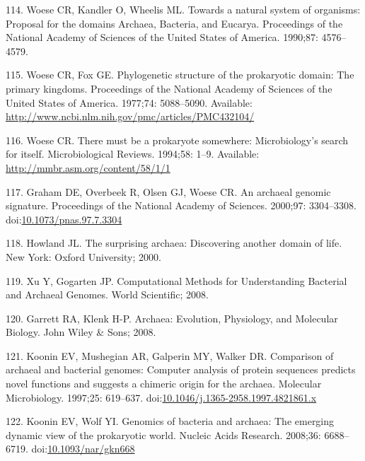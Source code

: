\documentclass[12pt,twoside]{reedthesis}
\begin{document}
  \hypertarget{ref-woeseux5ftowardsux5f1990}{}
  114. Woese CR, Kandler O, Wheelis ML. Towards a natural system of
  organisms: Proposal for the domains Archaea, Bacteria, and Eucarya.
  Proceedings of the National Academy of Sciences of the United States of
  America. 1990;87: 4576--4579.
  
  \hypertarget{ref-woeseux5fphylogeneticux5f1977}{}
  115. Woese CR, Fox GE. Phylogenetic structure of the prokaryotic domain:
  The primary kingdoms. Proceedings of the National Academy of Sciences of
  the United States of America. 1977;74: 5088--5090. Available:
  \url{http://www.ncbi.nlm.nih.gov/pmc/articles/PMC432104/}
  
  \hypertarget{ref-woeseux5fthereux5f1994}{}
  116. Woese CR. There must be a prokaryote somewhere: Microbiology's
  search for itself. Microbiological Reviews. 1994;58: 1--9. Available:
  \url{http://mmbr.asm.org/content/58/1/1}
  
  \hypertarget{ref-grahamux5farchaealux5f2000}{}
  117. Graham DE, Overbeek R, Olsen GJ, Woese CR. An archaeal genomic
  signature. Proceedings of the National Academy of Sciences. 2000;97:
  3304--3308.
  doi:\href{https://doi.org/10.1073/pnas.97.7.3304}{10.1073/pnas.97.7.3304}
  
  \hypertarget{ref-howlandux5fsurprisingux5f2000}{}
  118. Howland JL. The surprising archaea: Discovering another domain of
  life. New York: Oxford University; 2000.
  
  \hypertarget{ref-xuux5fcomputationalux5f2008}{}
  119. Xu Y, Gogarten JP. Computational Methods for Understanding
  Bacterial and Archaeal Genomes. World Scientific; 2008.
  
  \hypertarget{ref-garrettux5farchaeaux5f2008}{}
  120. Garrett RA, Klenk H-P. Archaea: Evolution, Physiology, and
  Molecular Biology. John Wiley \& Sons; 2008.
  
  \hypertarget{ref-kooninux5fcomparisonux5f1997}{}
  121. Koonin EV, Mushegian AR, Galperin MY, Walker DR. Comparison of
  archaeal and bacterial genomes: Computer analysis of protein sequences
  predicts novel functions and suggests a chimeric origin for the archaea.
  Molecular Microbiology. 1997;25: 619--637.
  doi:\href{https://doi.org/10.1046/j.1365-2958.1997.4821861.x}{10.1046/j.1365-2958.1997.4821861.x}
  
  \hypertarget{ref-kooninux5fgenomicsux5f2008}{}
  122. Koonin EV, Wolf YI. Genomics of bacteria and archaea: The emerging
  dynamic view of the prokaryotic world. Nucleic Acids Research. 2008;36:
  6688--6719.
  doi:\href{https://doi.org/10.1093/nar/gkn668}{10.1093/nar/gkn668}
  
\end{document}
